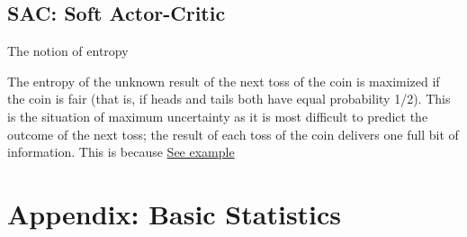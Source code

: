\documentclass{article}
\begin{document}
\subsection{SAC: Soft Actor-Critic}
The notion of entropy

The entropy of the unknown result of the next toss of the coin is maximized if the coin is fair (that is, if heads and tails both have equal probability 1/2). This is the situation of maximum uncertainty as it is most difficult to predict the outcome of the next toss; the result of each toss of the coin delivers one full bit of information. This is because
\href{https://en.wikipedia.org/wiki/Entropy_(information_theory)#:~:text=The%
}{See example}

\newpage
\section{Appendix: Basic Statistics}\label{apx:basic_statistics}
\end{document}
